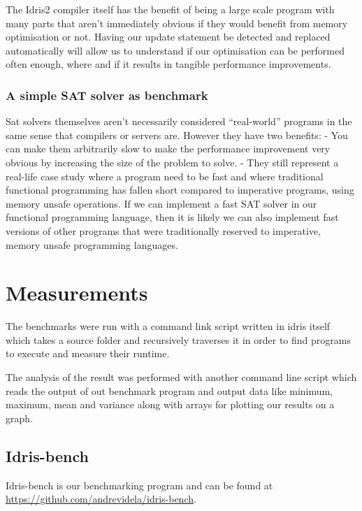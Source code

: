 \documentclass[
]{article}
\begin{document}
The Idris2 compiler itself has the benefit of being a large scale
program with many parts that aren't immediately obvious if they would
benefit from memory optimisation or not. Having our update statement be
detected and replaced automatically will allow us to understand if our
optimisation can be performed often enough, where and if it results in
tangible performance improvements.

\hypertarget{a-simple-sat-solver-as-benchmark}{%
\subsubsection{A simple SAT solver as
benchmark}\label{a-simple-sat-solver-as-benchmark}}

Sat solvers themselves aren't necessarily considered ``real-world''
programs in the same sense that compilers or servers are. However they
have two benefits: - You can make them arbitrarily slow to make the
performance improvement very obvious by increasing the size of the
problem to solve. - They still represent a real-life case study where a
program need to be fast and where traditional functional programming has
fallen short compared to imperative programs, using memory unsafe
operations. If we can implement a fast SAT solver in our functional
programming language, then it is likely we can also implement fast
versions of other programs that were traditionally reserved to
imperative, memory unsafe programming languages.

\hypertarget{measurements}{%
\section{Measurements}\label{measurements}}

The benchmarks were run with a command link script written in idris
itself which takes a source folder and recursively traverses it in order
to find programs to execute and measure their runtime.

The analysis of the result was performed with another command line
script which reads the output of out benchmark program and output data
like minimum, maximum, mean and variance along with arrays for plotting
our results on a graph.

\hypertarget{idris-bench}{%
\subsection{Idris-bench}\label{idris-bench}}

Idris-bench is our benchmarking program and can be found at
\url{https://github.com/andrevidela/idris-bench}.
\end{document}
